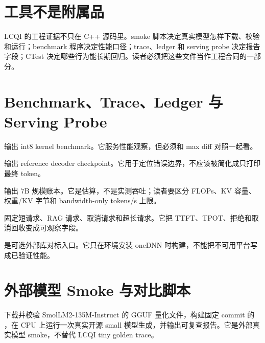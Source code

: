 \section{工具不是附属品}

LCQI 的工程证据不只在 C++ 源码里。smoke 脚本决定真实模型怎样下载、校验和运行；benchmark 程序决定性能口径；trace、ledger 和 serving probe 决定报告字段；CTest 决定哪些行为能长期回归。读者必须把这些文件当作工程合同的一部分。

\section{Benchmark、Trace、Ledger 与 Serving Probe}

 输出 int8 kernel benchmark。它服务性能观察，但必须和 max diff 对照一起看。



 输出 reference decoder checkpoint。它用于定位错误边界，不应该被简化成只打印最终 token。



 输出 7B 规模账本。它是估算，不是实测吞吐；读者要区分 FLOPs、KV 容量、权重/KV 字节和 bandwidth-only tokens/s 上限。



 固定短请求、RAG 请求、取消请求和超长请求。它把 TTFT、TPOT、拒绝和取消回收变成可观察字段。



 是可选外部库对标入口。它只在环境安装 oneDNN 时构建，不能把不可用平台写成已验证性能。



\section{外部模型 Smoke 与对比脚本}

 下载并校验 SmolLM2-135M-Instruct 的 GGUF 量化文件，构建固定 commit 的 ，在 CPU 上运行一次真实开源 small 模型生成，并输出可复查报告。它是外部真实模型 smoke，不替代 LCQI tiny golden trace。

